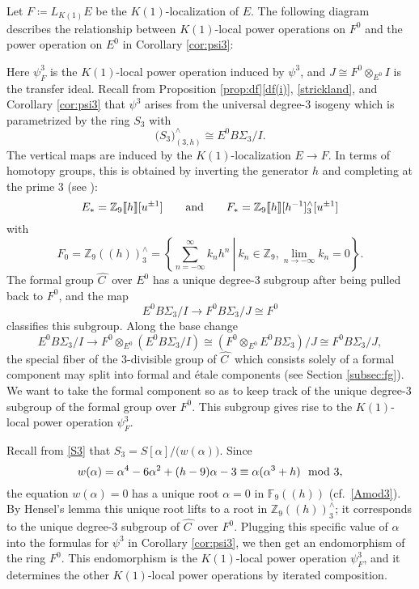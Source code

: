 \documentclass{gtpart}
\theoremstyle{definition}
\theoremstyle{remark}
\newcommand{\mb}[1]{\mathbb{#1}}
\newcommand{\BF}{{\mb F}}
\newcommand{\BZ}{{\mb Z}}
\newcommand{\HC}{\widehat{C~}\!}
\newcommand{\md}{~~{\rm mod}~}
\newcommand{\ad}{{\rm and}}
\newcommand{\A}{\alpha}
\newcommand{\p}{\psi^3}
\newcommand{\ce}{\coloneqq}
\numberwithin{equation}{section}
\numberwithin{thm}{section}
\begin{document}
Let $F \ce L_{K(1)} E$ be the $K(1)$-localization of $E$.  The following 
diagram describes the relationship between $K(1)$-local power operations 
on $F^0$ and the power operation on $E^0$ in Corollary \ref{cor:psi3}: 
\begin{center}
\end{center}
Here $\psi_F^3$ is the $K(1)$-local power operation induced by $\p$, and 
$J \cong F^0 \otimes_{E^0} I$ is the transfer ideal.  Recall from 
Proposition \ref{prop:df}\thinspace \eqref{df(i)}, \eqref{strickland}, 
and Corollary \ref{cor:psi3} that $\p$ arises from the universal 
degree-3 isogeny which is parametrized by the ring $S_3$ with 
\[
 \big( S_3 \big)_{(3,h)}^\wedge \cong E^0 B\Sigma_3 / I.  
\]
The vertical maps are induced by the $K(1)$-localization $E \to F$.  In 
terms of homotopy groups, this is obtained by inverting the generator 
$h$ and completing at the prime 3 (see \cite[Corollary 1.5.5]{hovey97}): 
\[
 E_* = \BZ_9 \llbracket h \rrbracket [u^{\pm1}] \qquad \ad \qquad 
 F_* = \BZ_9 \llbracket h \rrbracket [h^{-1}]_3^\wedge [u^{\pm1}] 
\]
with 
\[
 F_0 = \BZ_9 (\!(h)\!)_3^\wedge = 
 \left.\left\{\sum_{n = -\infty}^{\infty} k_n h^n~\right|~k_n \in \BZ_9, 
 \lim_{n \to -\infty} k_n = 0\right\}.  
\]
The formal group $\HC$ over $E^0$ has a unique degree-3 subgroup after 
being pulled back to $F^0$, and the map 
\[
 E^0 B\Sigma_3 / I \to F^0 B\Sigma_3 / J \cong F^0 
\]
classifies this subgroup.  Along the base change 
\[
 E^0 B\Sigma_3 / I \to F^0 \otimes_{E^0} (E^0 B\Sigma_3 / I) 
 \cong (F^0 \otimes_{E^0} E^0 B\Sigma_3) / J \cong F^0 B\Sigma_3 / J, 
\]
the special fiber of the 3-divisible group of $\HC$ which consists 
solely of a formal component may split into formal and \'etale 
components (see Section \ref{subsec:fg}).  We want to take the formal 
component so as to keep track of the unique degree-3 subgroup of the 
formal group over $F^0$.  This subgroup gives rise to the $K(1)$-local 
power operation $\psi_F^3$.  

Recall from \eqref{S3} that $S_3 = S[\A] \big/ \big( w(\A) \big)$.  
Since 
\[
 w(\A) = \A^4 - 6 \A^2 + (h - 9) \A - 3 \equiv \A (\A^3 + h) \md 3, 
\]
the equation $w(\A) = 0$ has a unique root $\A = 0$ in $\BF_9 (\!(h)\!)$ 
(cf.~\eqref{Amod3}).  By Hensel's lemma this unique root lifts to a root 
in $\BZ_9 (\!(h)\!)_3^\wedge$; it corresponds to the unique degree-3 
subgroup of $\HC$ over $F^0$.  Plugging this specific value of $\A$ into 
the formulas for $\p$ in Corollary \ref{cor:psi3}, we then get an 
endomorphism of the ring $F^0$.  This endomorphism is the $K(1)$-local 
power operation $\psi_F^3$, and it determines the other $K(1)$-local 
power operations by iterated composition.  
\end{document}
